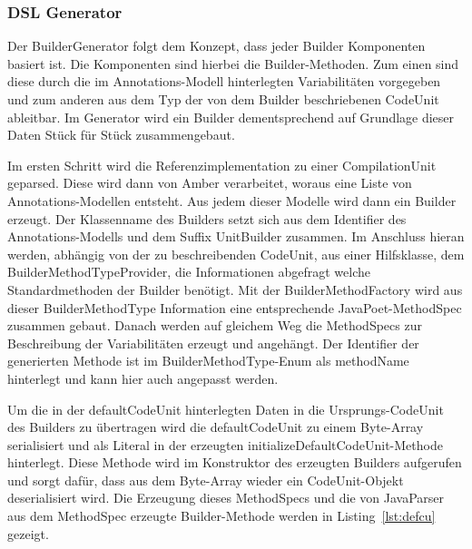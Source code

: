 \documentclass[12pt,oneside,a4paper,parskip]{scrbook}
\begin{document}
\subsubsection{DSL Generator}\label{sec:dslgen}

Der BuilderGenerator folgt dem Konzept, dass jeder Builder Komponenten basiert ist. Die Komponenten sind hierbei die Builder-Methoden. Zum einen sind diese durch die im Annotations-Modell hinterlegten Variabilitäten vorgegeben und zum anderen aus dem Typ der von dem Builder beschriebenen CodeUnit ableitbar. Im Generator wird ein Builder dementsprechend auf Grundlage dieser Daten Stück für Stück zusammengebaut.

Im ersten Schritt wird die Referenzimplementation zu einer CompilationUnit geparsed. Diese wird dann von Amber verarbeitet, woraus eine Liste von Annotations-Modellen entsteht. Aus jedem dieser Modelle wird dann ein Builder erzeugt. Der Klassenname des Builders setzt sich aus dem Identifier des Annotations-Modells und dem Suffix UnitBuilder zusammen. Im Anschluss hieran werden, abhängig von der zu beschreibenden CodeUnit, aus einer Hilfsklasse, dem BuilderMethodTypeProvider, die Informationen abgefragt welche Standardmethoden der Builder benötigt. Mit der BuilderMethodFactory wird aus dieser BuilderMethodType Information eine entsprechende JavaPoet-MethodSpec zusammen gebaut. Danach werden auf gleichem Weg die MethodSpecs zur Beschreibung der Variabilitäten erzeugt und angehängt. Der Identifier der generierten Methode ist im BuilderMethodType-Enum als methodName hinterlegt und kann hier auch angepasst werden.

Um die in der defaultCodeUnit hinterlegten Daten in die Ursprungs-CodeUnit des Builders zu übertragen wird die defaultCodeUnit zu einem Byte-Array serialisiert und als Literal in der erzeugten initializeDefaultCodeUnit-Methode hinterlegt. Diese Methode wird im Konstruktor des erzeugten Builders aufgerufen und sorgt dafür, dass aus dem Byte-Array wieder ein CodeUnit-Objekt deserialisiert wird. Die Erzeugung dieses MethodSpecs und die von JavaParser aus dem MethodSpec erzeugte Builder-Methode werden in Listing~\ref{lst:defcu} gezeigt.
\end{document}
